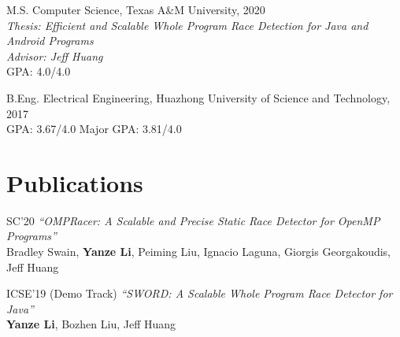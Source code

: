 \documentclass[12pt,letterpaper]{report}
\newcommand{\listtabwidth}{1.75cm}
\begin{document}
	\begin{tablist}
		
		
		\item[M.S.]  \tab Computer Science, Texas A\&M University, 2020 \\
		\textit{Thesis: Efficient and Scalable Whole Program Race Detection for Java and Android Programs}\\
		\textit{Advisor: Jeff Huang}\\
		GPA: 4.0/4.0
		
		\item[B.Eng.]  \tab Electrical Engineering, Huazhong University of Science and Technology, 2017 \\
		GPA: 3.67/4.0 \hspace{0.5cm} Major GPA: 3.81/4.0
				
	\end{tablist}


	


	\section*{Publications}
	\begin{tablist}
		 \item[SC'20] \tab \textit{\enquote{OMPRacer: A Scalable and Precise Static Race Detector for OpenMP Programs}}\\
		 		           Bradley Swain, \textbf{Yanze Li}, Peiming Liu, Ignacio Laguna, Giorgis Georgakoudis, Jeff Huang
		\item[ICSE'19] \tab (Demo Track) \textit{\enquote{SWORD: A Scalable Whole Program Race Detector for Java}} \\
							 \textbf{Yanze Li}, Bozhen Liu, Jeff Huang
	\end{tablist}

\renewcommand{\listtabwidth}{2.5cm}
\end{document}
